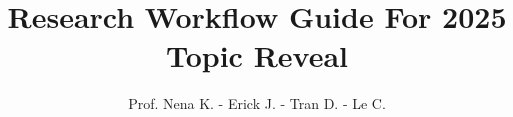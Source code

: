 \documentclass[]{report}
\title{Research Workflow Guide For 2025 Topic Reveal}
\author{Prof. Nena K. - Erick J. - Tran D. - Le C.}
\begin{document}
	\maketitl
	\tableofcontent
	\doublespacing

%

%
	
 

%
\end{document}
